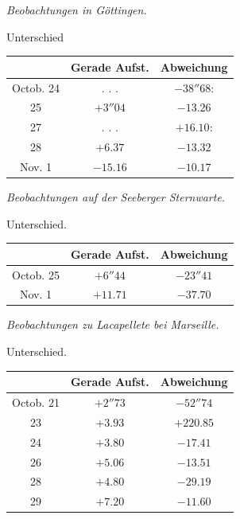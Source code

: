 \medskip
{}\noindent\emph{Beobachtungen in Göttingen.} 

\begin{center}
Unterschied

\fontsize{10}{12}\selectfont\setlength{\tabcolsep}{7pt}\renewcommand{\arraystretch}{1.15}\begin{tabular}{|c|c|c|}
\hline
 & Gerade Aufst. & Abweichung \\
\hline
Octob. 24 & . . . & $-38''68$: \\
25 & $+3''04$ & $-13.26$ \\
27 & . . . & $+16.10$: \\
28 & $+6.37$ & $-13.32$ \\
Nov. 1 & $-15.16$ & $-10.17$ \\
\hline
\end{tabular}
\end{center}

\noindent\emph{Beobachtungen auf der Seeberger Sternwarte.}

\begin{center}
Unterschied.

\fontsize{10}{12}\selectfont\setlength{\tabcolsep}{7pt}\renewcommand{\arraystretch}{1.15}\begin{tabular}{|c|c|c|}
\hline
 & Gerade Aufst. & Abweichung \\
\hline
Octob. 25 & $+6''44$ & $-23''41$ \\
Nov. 1 & $+11.71$ & $-37.70$ \\
\hline
\end{tabular}
\end{center}

\medskip
{}\noindent\emph{Beobachtungen zu Lacapellete bei Marseille.}

\begin{center}
Unterschied.

\fontsize{10}{12}\selectfont\setlength{\tabcolsep}{7pt}\renewcommand{\arraystretch}{1.15}\begin{tabular}{|c|c|c|}
\hline
 & Gerade Aufst. & Abweichung \\
\hline
Octob. 21 & $+2''73$ & $-52''74$ \\
23 & $+3.93$ & $+220.85$ \\
24 & $+3.80$ & $-17.41$ \\
26 & $+5.06$ & $-13.51$ \\
28 & $+4.80$ & $-29.19$ \\
29 & $+7.20$ & $-11.60$ \\
\hline
\end{tabular}
\end{center}

